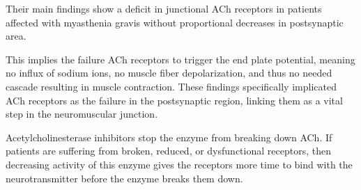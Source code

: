 \documentclass[plain,basic]{inVerba-notes}
\begin{document}
\begin{enumerate}

  Their main findings show a deficit in junctional ACh receptors in patients affected with myasthenia gravis without proportional decreases in postsynaptic area.

  This implies the failure ACh receptors to trigger the end plate potential, meaning no influx of sodium ions, no muscle fiber depolarization, and thus no needed cascade resulting in muscle contraction. These findings specifically implicated ACh receptors as the failure in the postsynaptic region, linking them as a vital step in the neuromuscular junction. 


  Acetylcholinesterase inhibitors stop the enzyme from breaking down ACh. If patients are suffering from broken, reduced, or dysfunctional receptors, then decreasing activity of this enzyme gives the receptors more time to bind with the neurotransmitter before the enzyme breaks them down.
\end{enumerate}
\end{document}
